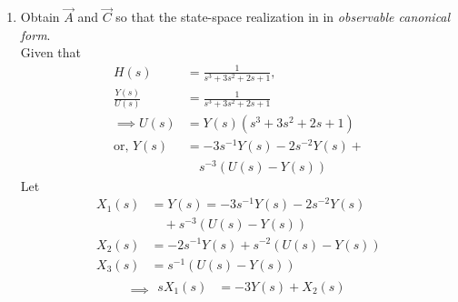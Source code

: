 \begin{enumerate}[label=\thesection.\arabic*.,ref=\thesection.\theenumi]
\item Obtain $\vec{A}$ and $\vec{C}$ so that the state-space realization in in {\em observable canonical form}.
\\
\solution  Given that
\begin{align}
H(s)&=\frac{1}{s^3+3s^2+2s+1},
\\
\frac{Y(s)}{U(s)}&=\frac{1}{s^3+3s^2+2s+1} \\
\implies  U(s)&=Y(s)  (s^3+3s^2+2s+1)
\\
\text{or, }Y(s)&=-3s^{-1}Y(s)-2s^{-2}Y(s)+
\nonumber \\
&\quad s^{-3}(U(s)-Y(s))
\end{align}
Let
\begin{align}
X_{1}(s)&=Y(s) = -3s^{-1}Y(s)-2s^{-2}Y(s) \nonumber \\
&\quad +s^{-3}(U(s)-Y(s))\\
X_{2}(s)&=-2s^{-1}Y(s)+s^{-2}(U(s)-Y(s))\\
X_{3}(s)&=s^{-1}(U(s)-Y(s))
\end{align} 
\begin{align}
\implies
\begin{split}
sX_{1}(s)&=-3Y(s)+X_{2}(s)\\

\end{split}
\end{align}
\end{enumerate}
